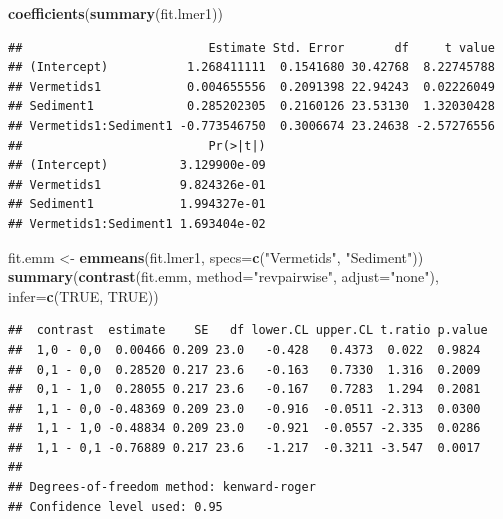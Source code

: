 \documentclass[]{book}
\newenvironment{Shaded}{\begin{snugshade}}{\end{snugshade}}
\newcommand{\KeywordTok}[1]{\textcolor[rgb]{0.13,0.29,0.53}{\textbf{#1}}}
\newcommand{\DataTypeTok}[1]{\textcolor[rgb]{0.13,0.29,0.53}{#1}}
\newcommand{\StringTok}[1]{\textcolor[rgb]{0.31,0.60,0.02}{#1}}
\newcommand{\OtherTok}[1]{\textcolor[rgb]{0.56,0.35,0.01}{#1}}
\newcommand{\NormalTok}[1]{#1}
\begin{document}
\begin{Shaded}
\begin{Highlighting}[]
\KeywordTok{coefficients}\NormalTok{(}\KeywordTok{summary}\NormalTok{(fit.lmer1))}
\end{Highlighting}
\end{Shaded}

\begin{verbatim}
##                          Estimate Std. Error       df     t value
## (Intercept)           1.268411111  0.1541680 30.42768  8.22745788
## Vermetids1            0.004655556  0.2091398 22.94243  0.02226049
## Sediment1             0.285202305  0.2160126 23.53130  1.32030428
## Vermetids1:Sediment1 -0.773546750  0.3006674 23.24638 -2.57276556
##                          Pr(>|t|)
## (Intercept)          3.129900e-09
## Vermetids1           9.824326e-01
## Sediment1            1.994327e-01
## Vermetids1:Sediment1 1.693404e-02
\end{verbatim}

\begin{Shaded}
\begin{Highlighting}[]
\NormalTok{fit.emm <-}\StringTok{ }\KeywordTok{emmeans}\NormalTok{(fit.lmer1, }\DataTypeTok{specs=}\KeywordTok{c}\NormalTok{(}\StringTok{"Vermetids"}\NormalTok{, }\StringTok{"Sediment"}\NormalTok{))}
\KeywordTok{summary}\NormalTok{(}\KeywordTok{contrast}\NormalTok{(fit.emm, }\DataTypeTok{method=}\StringTok{"revpairwise"}\NormalTok{, }\DataTypeTok{adjust=}\StringTok{"none"}\NormalTok{), }\DataTypeTok{infer=}\KeywordTok{c}\NormalTok{(}\OtherTok{TRUE}\NormalTok{, }\OtherTok{TRUE}\NormalTok{))}
\end{Highlighting}
\end{Shaded}

\begin{verbatim}
##  contrast  estimate    SE   df lower.CL upper.CL t.ratio p.value
##  1,0 - 0,0  0.00466 0.209 23.0   -0.428   0.4373  0.022  0.9824 
##  0,1 - 0,0  0.28520 0.217 23.6   -0.163   0.7330  1.316  0.2009 
##  0,1 - 1,0  0.28055 0.217 23.6   -0.167   0.7283  1.294  0.2081 
##  1,1 - 0,0 -0.48369 0.209 23.0   -0.916  -0.0511 -2.313  0.0300 
##  1,1 - 1,0 -0.48834 0.209 23.0   -0.921  -0.0557 -2.335  0.0286 
##  1,1 - 0,1 -0.76889 0.217 23.6   -1.217  -0.3211 -3.547  0.0017 
## 
## Degrees-of-freedom method: kenward-roger 
## Confidence level used: 0.95
\end{verbatim}
\end{document}
